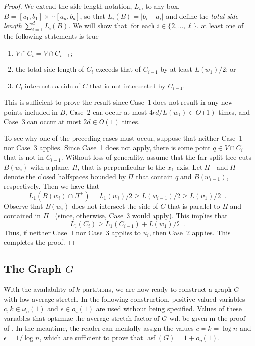 \documentclass{patmorin}
\DeclareMathOperator{\asf}{asf}
\begin{document}
\begin{proof}
  We extend the side-length notation, $L_i$, to any box,
  $B=[a_1,b_1]\times\cdots[a_d,b_d]$, so that $L_i(B)=|b_i-a_i|$ and
  define the \emph{total side length} $\sum_{i=1}^d L_i(B)$.  We will
  show that, for each $i\in\{2,\ldots,\ell\}$, at least one of the
  following statements is true
  \begin{enumerate}
    \item $V\cap C_i = V\cap C_{i-1}$; 
    \item the total side length of $C_i$ exceeds that of $C_{i-1}$ by at least
      $L(w_1)/2$; or
    \item $C_i$ intersects a side of $C$ that is not intersected by $C_{i-1}$.
  \end{enumerate}
  This is sufficient to prove the result since Case~1 does not result in
  any new points included in $B$, Case~2 can occur at most $4rd/L(w_1)\in
  O(1)$ times, and Case~3 can occur at most $2d\in O(1)$ times.

  To see why one of the preceding cases must occur, suppose that neither
  Case~1 nor Case~3 applies.  Since Case~1 does not apply, there is
  some point $q\in V\cap C_i$ that is not in $C_{i-1}$. 
  Without loss of generality, assume that the fair-split tree cuts
  $B(w_i)$ with a plane, $\Pi$, that is perpendicular to the $x_1$-axis.
  Let $\Pi^+$ and $\Pi^-$ denote the closed halfspaces bounded by $\Pi$
  that contain $q$ and $B(w_{i-1})$, respectively.  Then we have that
  \[
      L_1(B(w_i)\cap \Pi^+) 
          = L_1(w_i)/2 
          \ge L(w_{i-1})/2 
          \ge L(w_{1})/2  \enspace .
  \]
  Observe that $B(w_{i})$ does not intersect the side of $C$ that is
  parallel to $\Pi$ and contained in $\Pi^+$ (since, otherwise, Case~3
  would apply).  This implies that
  \[
      L_1(C_i) \ge L_1(C_{i-1}) + L(w_1)/2 \enspace .
  \] 
  Thus, if neither Case~1 nor Case~3 applies to $u_i$, then Case~2
  applies.  This completes the proof.
\end{proof}

\subsection{The Graph $G$}

With the availability of $k$-partitions, we are now ready to construct
a graph $G$ with low average stretch.  In the following construction,
positive valued variables $c,k\in\omega_n(1)$ and $\epsilon\in o_n(1)$
are used without being specified.  Values of these variables that
optimize the average stretch factor of $G$ will be given in the proof
of .  In the meantime, the reader can mentally assign the
values $c=k=\log n$ and $\epsilon = 1/\log n$, which are sufficient to
prove that $\asf(G)=1+o_n(1)$.
\end{document}
